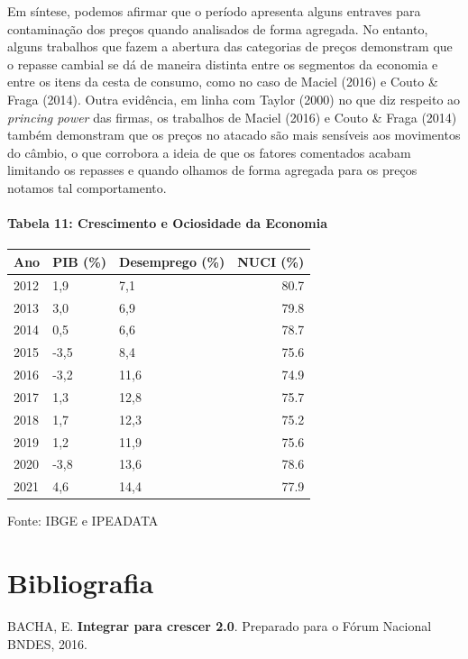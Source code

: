 \documentclass[12pt]{article}
\begin{document}
Em síntese, podemos afirmar que o período apresenta alguns entraves para
contaminação dos preços quando analisados de forma agregada. No entanto,
alguns trabalhos que fazem a abertura das categorias de preços
demonstram que o repasse cambial se dá de maneira distinta entre os
segmentos da economia e entre os itens da cesta de consumo, como no caso
de Maciel (2016) e Couto \& Fraga (2014). Outra evidência, em linha com
Taylor (2000) no que diz respeito ao \emph{princing power} das firmas,
os trabalhos de Maciel (2016) e Couto \& Fraga (2014) também demonstram
que os preços no atacado são mais sensíveis aos movimentos do câmbio, o
que corrobora a ideia de que os fatores comentados acabam limitando os
repasses e quando olhamos de forma agregada para os preços notamos tal
comportamento.

\hypertarget{tabela-11-crescimento-e-ociosidade-da-economia}{%
\paragraph{Tabela 11: Crescimento e Ociosidade da
Economia}\label{tabela-11-crescimento-e-ociosidade-da-economia}}

\begin{longtable}[]{@{}lllr@{}}
\toprule
Ano & PIB (\%) & Desemprego (\%) & NUCI (\%) \\
\midrule
\endhead
2012 & 1,9 & 7,1 & 80.7 \\
2013 & 3,0 & 6,9 & 79.8 \\
2014 & 0,5 & 6,6 & 78.7 \\
2015 & -3,5 & 8,4 & 75.6 \\
2016 & -3,2 & 11,6 & 74.9 \\
2017 & 1,3 & 12,8 & 75.7 \\
2018 & 1,7 & 12,3 & 75.2 \\
2019 & 1,2 & 11,9 & 75.6 \\
2020 & -3,8 & 13,6 & 78.6 \\
2021 & 4,6 & 14,4 & 77.9 \\
\bottomrule
\end{longtable}

Fonte: IBGE e IPEADATA

\hypertarget{bibliografia}{%
\section{Bibliografia}\label{bibliografia}}

BACHA, E. \textbf{Integrar para crescer 2.0}. Preparado para o Fórum
Nacional BNDES, 2016.
\end{document}
